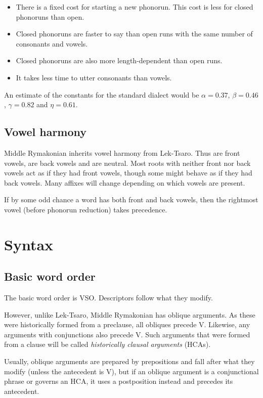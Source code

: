 \documentclass{book}
\newcommand{\lname}{Middle Rymakonian}
\begin{document}
\begin{itemize}
  \item There is a fixed cost for starting a new phonorun. This cost is less for closed phonoruns than open.
  \item Closed phonoruns are faster to say than open runs with the same number of consonants and vowels.
  \item Closed phonoruns are also more length-dependent than open runs.
  \item It takes less time to utter consonants than vowels.
\end{itemize}

An estimate of the constants for the standard dialect would be $\alpha = 0.37$, $\beta = 0.46$, $\gamma = 0.82$ and $\eta = 0.61$.

\section{Vowel harmony}

\lname{} inherits vowel harmony from Lek-Tsaro. Thus  are front vowels,  are back vowels and  are neutral. Most roots with neither front nor back vowels act as if they had front vowels, though some might behave as if they had back vowels. Many affixes will change depending on which vowels are present.

If by some odd chance a word has both front and back vowels, then the rightmost vowel (before phonorun reduction) takes precedence.

\chapter{Syntax}

\section{Basic word order}

The basic word order is VSO. Descriptors follow what they modify.

However, unlike Lek-Tsaro, \lname{} has oblique arguments. As these were historically formed from a preclause, all obliques precede V. Likewise, any arguments with conjunctions also precede V. Such arguments that were formed from a clause will be called \emph{historically clausal arguments} (HCAs).

Usually, oblique arguments are prepared by prepositions and fall after what they modify (unless the antecedent is V), but if an oblique argument is a conjunctional phrase or governs an HCA, it uses a postposition instead and precedes its antecedent.
\end{document}

